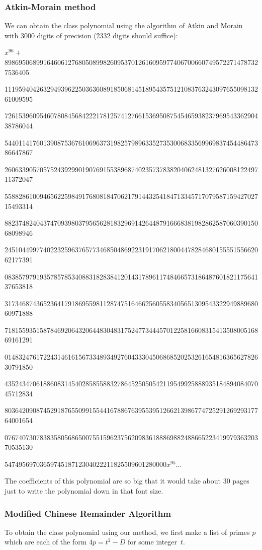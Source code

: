 \documentclass{amsart}
\theoremstyle{plain}
\begin{document}
\subsubsection{Atkin-Morain method}

We can obtain the class polynomial using the algorithm of Atkin and Morain 
with 3000 digits of precision (2332 digits should suffice): 

\tiny
$x^{96} +$ 
8986950689916460612768050899826095370126160959774067006607495722714787327536405

11195940426329493962250363608918506814518954357512108376324309765509813261009595

72615396095460780845684222178125741276615369508754546593823796954336290438786044

54401141760139087536761069637319825798963352735300683356996983745448647386647867

26063390570575243929901907691553896874023573783820406248132762600812249711372047

55882861009465622598491768081847062179144325418471334571707958715942702715493314

88237482404374709398037956562818329691426448791666838198286258706039015068098946

24510449977402232596376577346850486922319170621800447828468015555155662062177391

08385797919357857853408831828384120143178961174846657318648760182117564137653818

31734687436523641791869559811287475164662560558340565130954332294988968060971888

71815593515878469206432064483048317524773444570122581660831541350800516869161291

01483247617224314616156733489349276043330450686852025326165481636562782630791850

43524347061886083145402858558832786452505054211954992588893518489408407045712834

80364209087452918765509915544167886763955395126621398677472529126929317764001654

07674073078383580568650075515962375620983618886988248866522341997936320370535130

5474956970365974518712304022211825509601280000$x^{95} \dots$ 

\normalsize

The coefficients of this polynomial are so big that it would take about $30$
pages just to write the polynomial down in that font size.  

\subsubsection{Modified Chinese Remainder Algorithm}
To obtain the class polynomial using our method, we first make a
list of primes $p$ which are each of the form $4p = t^2 -D$ for some integer~$t$. 
\end{document}

